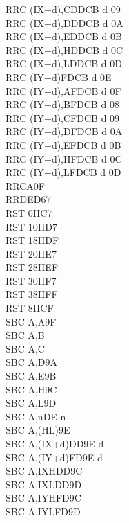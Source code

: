 \begin{multicols}{3}
{\begin{tabbing}
        RRC (IX+d),C\UNDOC\>DDCB d 09\\
        RRC (IX+d),D\UNDOC\>DDCB d 0A\\
        RRC (IX+d),E\UNDOC\>DDCB d 0B\\
        RRC (IX+d),H\UNDOC\>DDCB d 0C\\
        RRC (IX+d),L\UNDOC\>DDCB d 0D\\
        RRC (IY+d)\>FDCB d 0E\\
        RRC (IY+d),A\UNDOC\>FDCB d 0F\\
        RRC (IY+d),B\UNDOC\>FDCB d 08\\
        RRC (IY+d),C\UNDOC\>FDCB d 09\\
        RRC (IY+d),D\UNDOC\>FDCB d 0A\\
        RRC (IY+d),E\UNDOC\>FDCB d 0B\\
        RRC (IY+d),H\UNDOC\>FDCB d 0C\\
        RRC (IY+d),L\UNDOC\>FDCB d 0D\\
        RRCA\>0F\\
        RRD\>ED67\\
        RST 0H\>C7\\
        RST 10H\>D7\\
        RST 18H\>DF\\
        RST 20H\>E7\\
        RST 28H\>EF\\
        RST 30H\>F7\\
        RST 38H\>FF\\
        RST 8H\>CF\\
        SBC A,A\>9F\\
        SBC A,B\\
        SBC A,C\\
        SBC A,D\>9A\\
        SBC A,E\>9B\\
        SBC A,H\>9C\\
        SBC A,L\>9D\\
        SBC A,n\>DE n\\
        SBC A,(HL)\>9E\\
        SBC A,(IX+d)\>DD9E d\\
        SBC A,(IY+d)\>FD9E d\\
        SBC A,IXH\UNDOC\>DD9C\\
        SBC A,IXL\UNDOC\>DD9D\\
        SBC A,IYH\UNDOC\>FD9C\\
        SBC A,IYL\UNDOC\>FD9D\\

\end{tabbing}}
\end{multicols}
